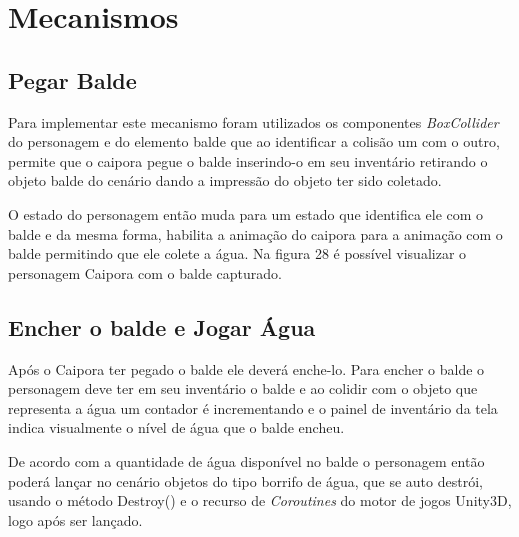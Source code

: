 \section{Mecanismos}

\subsection{Pegar Balde}

 Para implementar este mecanismo foram utilizados os componentes \textit{BoxCollider} do personagem e do elemento balde que ao identificar a colisão um com o outro, permite que o caipora pegue o balde inserindo-o em seu inventário retirando o objeto balde do cenário dando a impressão do objeto ter sido coletado.
 
 O estado do personagem então muda para um estado que identifica ele com o balde e da mesma forma, habilita a animação do caipora para a animação com o balde permitindo que ele colete a água. Na figura 28 é possível visualizar o personagem Caipora com o balde capturado.
 \pagebreak

\begin{figure}[h!]
		\centering
	\end{figure}
	
	
\subsection{Encher o balde e Jogar Água}
Após o Caipora ter pegado o balde ele deverá enche-lo. Para encher o balde o personagem deve ter em seu inventário o balde e ao colidir com o objeto que representa a água um contador é incrementando e o painel de inventário da tela indica visualmente o nível de água que o balde encheu. 

De acordo com a quantidade de água disponível no balde o personagem então poderá lançar no cenário objetos do tipo borrifo de água, que se auto destrói, usando o método Destroy() e o recurso de \textit{Coroutines} do motor de jogos Unity3D, logo após ser lançado.

